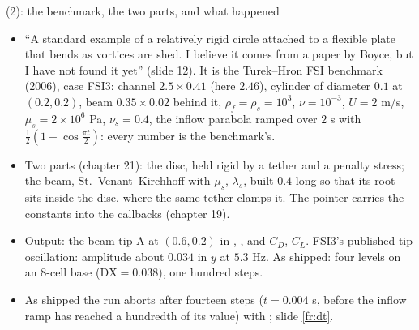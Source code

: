 \documentclass[aspectratio=169,11pt]{beamer}
\begin{document}
\begin{frame}{ (2): the benchmark, the two parts, and what happened}
\label{fr:ex6b}
\footnotesize
\begin{itemize}
  \item ``A standard example of a relatively rigid circle attached to a flexible plate that bends as vortices are shed. I believe it comes from a paper by Boyce, but I have not found it yet'' (slide 12). It is the Turek--Hron FSI benchmark (2006), case FSI3: channel $2.5\times0.41$ (here $2.46$), cylinder of diameter $0.1$ at $(0.2, 0.2)$, beam $0.35\times0.02$ behind it, $\rho_f = \rho_s = 10^3$, $\nu = 10^{-3}$, $\bar U = 2$ m/s, $\mu_s = 2\times10^6$ Pa, $\nu_s = 0.4$, the inflow parabola ramped over $2$ s with $\tfrac12(1 - \cos\tfrac{\pi t}{2})$: every number is the benchmark's.
  \item Two parts (chapter 21): the disc, held rigid by a tether and a penalty stress; the beam, St.\ Venant--Kirchhoff with $\mu_s$, $\lambda_s$, built $0.4$ long so that its root sits inside the disc, where the same tether clamps it. The  pointer carries the constants into the callbacks (chapter 19).
  \item Output: the beam tip A at $(0.6, 0.2)$ in , , and $C_D$, $C_L$. FSI3's published tip oscillation: amplitude about $0.034$ in $y$ at $5.3$ Hz. As shipped: four levels on an $8$-cell base ($\mathrm{DX} = 0.038$), one hundred steps.
  \item {} As shipped the run aborts after fourteen steps ($t = 0.004$ s, before the inflow ramp has reached a hundredth of its value) with ; slide \ref{fr:dt}.
\end{itemize}
\end{frame}
\end{document}
